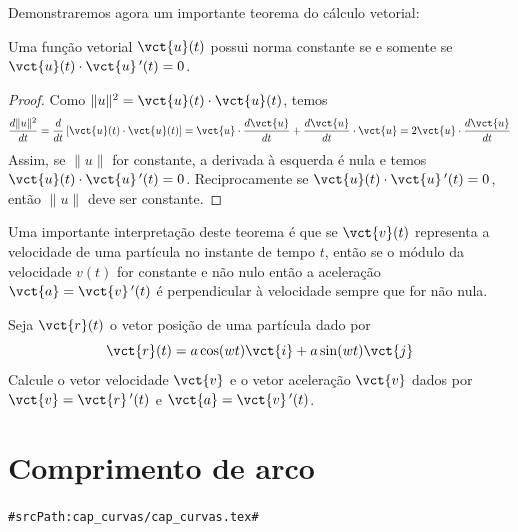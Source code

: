 Demonstraremos agora um importante teorema do cálculo vetorial:
\begin{teo}\label{teodernormacst} Uma função vetorial $\vct{u}(t)$ possui norma constante se e somente se $\vct{u}(t)\cdot\vct{u}\!~'(t)=0$. 
\end{teo}
\begin{proof} Como $\|u\|^2=\vct{u}(t)\cdot\vct{u}(t)$, temos
$$\frac{d \|u\|^2}{dt}=\frac{d}{dt}\left[\vct{u}(t)\cdot\vct{u}(t)\right]=\vct{u}\cdot\frac{d\vct{u}}{dt}+\frac{d\vct{u}}{dt}\cdot\vct{u}=2\vct{u}\cdot\frac{d\vct{u}}{dt}$$
Assim, se $\|u\|$ for constante, a derivada à esquerda é nula e temos $\vct{u}(t)\cdot\vct{u}\!~'(t)=0$. Reciprocamente se $\vct{u}(t)\cdot\vct{u}\!~'(t)=0$, então $\|u\|$ deve ser constante.
\end{proof}
\begin{obs} Uma importante interpretação deste teorema é que se $\vct{v}(t)$ representa a velocidade de uma partícula no instante de tempo $t$, então se o módulo da velocidade $v(t)$ for constante e não nulo então a aceleração $\vct{a}=\vct{v}\!~'(t)$ é perpendicular à velocidade sempre que for não nula.  
\end{obs}




\begin{ex}Seja $\vct{r}(t)$ o vetor posição de uma partícula dado por
$$\vct{r}(t)=a\cos(wt)\vct{i}+a\sin(wt)\vct{j}$$
Calcule o vetor velocidade $\vct{v}$ e o vetor aceleração $\vct{v}$ dados por $\vct{v}=\vct{r}~\!'(t)$ e $\vct{a}=\vct{v}~\!'(t)$.
\end{ex}



 
 \section{Comprimento de arco}
\verb+#srcPath:cap_curvas/cap_curvas.tex#+

  
